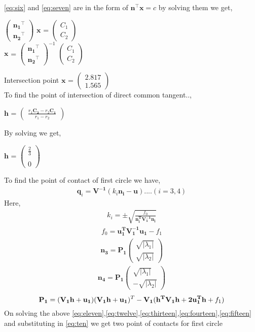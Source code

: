 \documentclass[journal,12pt,twocolumn]{IEEEtran}
\newcommand{\myvec}[1]{\ensuremath{\begin{pmatrix}#1\end{pmatrix}}}
\let\vec\mathbf
\begin{document}
\eqref{eq:six} and \eqref{eq:seven} are in the form of $\vec{n^{\top}}\vec{x}=c$ by solving them we get,
\begin{center}
$\myvec{\vec{n_1}^{\top} \\ \vec{n_2}^{\top}}$ $\vec{x}$ = $\myvec{C_1 \\ C_2}$\\
$\vec{x}$ = $\myvec{\vec{n_1}^{\top} \\ \vec{n_2}^{\top}}^{-1}$ $\myvec{C_1 \\ C_2}$
\end{center}
Intersection point $\vec{x}$ = $\myvec{2.817 \\ 1.565}$\\
To find the point of intersection of direct common tangent..,
\begin{center}
$\vec{h}$ =  $\myvec{\frac{r_1 \vec{C_2} - r_2 \vec{C_1}}{r_1 - r_2}}$
\end{center}
By solving we get,
\begin{center}
$\vec{h}$ = $\myvec{\frac{2}{3} \\ \\ 0}$ 
\end{center}
To find the point of contact of first circle we have,
\begin{align}
\label{eq:ten}
\boxed{\vec{q}_i = \vec{V^{-1}}(k_i\vec{n_i-u})}....(i = 3,4) 
\end{align}
Here, 
\begin{align}
\label{eq:eleven}
k_i = \pm\sqrt{\frac{f_0}{\vec{n_i^TV_1^{-1}n_i}}}
\end{align}
\begin{align}
\label{eq:twelve}
f_0 = \vec{u_1^TV_1^{-1}u_1}-f_1
\end{align}
\begin{align}
\label{eq:thirteen}
\vec{n_3} = \vec{P_1}\myvec{\sqrt{|\lambda_1|} \\ \sqrt{|\lambda_2|}}
\end{align}
\begin{align}
\label{eq:fourteen}
\vec{n_4} = \vec{P_1}\myvec{\sqrt{|\lambda_1|} \\ -\sqrt{|\lambda_2|}}
\end{align}
\begin{equation}
\label{eq:fifteen}
\small\vec{P_1}=(\vec{V_1h+u_1})(\vec{V_1h+u_1})^T- \\ \vec{V_1(h^TV_1h+2u_1^Th}+f_1)
\end{equation}
On solving the above \eqref{eq:eleven},\eqref{eq:twelve},\eqref{eq:thirteen},\eqref{eq:fourteen},\eqref{eq:fifteen} and substituting in \eqref{eq:ten} we get two point of contacts for first circle 
\end{document}
